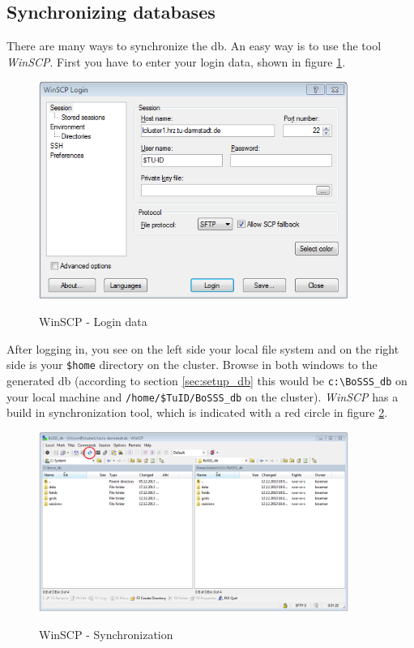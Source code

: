 \documentclass[11pt,twoside,a4paper]{fdyartcl}
\begin{document}
\subsection{Synchronizing databases}
\label{sec:synchronize_db}
There are many ways to synchronize the db. An easy way is to use the tool \emph{WinSCP}. First you have to enter your login data, shown in figure \ref{fig:winscp_login}.
\begin{figure}[h] %
  \begin{centering}
  \includegraphics[width=0.9\textwidth]{Figures/winscp_login.png}\\
  \end{centering}
  \caption{WinSCP - Login data}\label{fig:winscp_login}
\end{figure} %
After logging in, you see on the left side your local file system and on the right side is your \verb|$home| directory on the cluster. Browse in both windows to the generated db (according to section \ref{sec:setup_db} this would be \verb|c:\BoSSS_db| on your local machine and \verb|/home/$TuID/BoSSS_db| on the cluster). \emph{WinSCP} has a build in synchronization tool, which is indicated with a red circle in figure \ref{fig:winscp_sync}.
\begin{figure}[t] %
  \begin{centering}
  \includegraphics[width=0.9\textwidth]{Figures/winscp_sync.png}\\
  \end{centering}
  \caption{WinSCP - Synchronization}\label{fig:winscp_sync}
\end{figure} %
\end{document}
